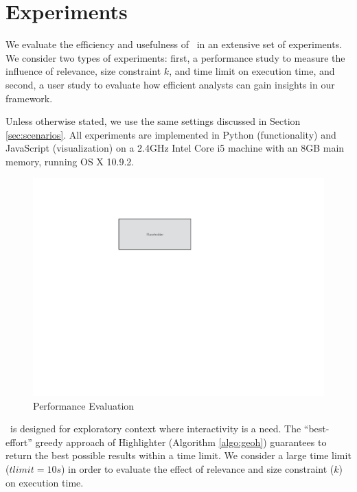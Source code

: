 \section{Experiments}
\label{sec:exp}
We evaluate the efficiency and usefulness of \framework\ in an extensive set of experiments. We consider two types of experiments: first, a performance study to measure the influence of relevance, size constraint $k$, and time limit on execution time, and second, a user study to evaluate how efficient analysts can gain insights in our framework.

\vspace{5pt}
 Unless otherwise stated, we use the same settings discussed in Section \ref{sec:scenarios}. All experiments are implemented in Python (functionality) and JavaScript (visualization) on a 2.4GHz Intel Core i5 machine with an 8GB main memory, running OS X 10.9.2.

\begin{figure}
  \centering
  \includegraphics[width=\columnwidth]{figs/placeholder}
\caption{Performance Evaluation}
\label{fig:performance}
\end{figure}

\vspace{5pt}
 \framework\ is designed for exploratory context where interactivity is a need. The ``best-effort'' greedy approach of {\sc Highlighter} (Algorithm \ref{algo:geoh}) guarantees to return the best possible results within a time limit. We consider a large time limit ($tlimit = 10s$) in order to evaluate the effect of relevance and size constraint ($k$) on execution time.


